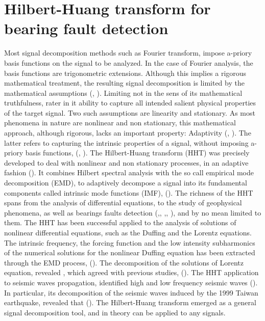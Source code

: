 \documentclass[../Main/thesis.tex]{subfiles}
\begin{document}
\chapter[Hilbert-Huang transform applied to bearing fault detection]{Hilbert-Huang transform for bearing fault detection}
\label{sec:hht}

Most signal decomposition methods such as Fourier transform, impose a-priory basis functions on the signal to be analyzed. In the case of Fourier analysis, the basis functions are trigonometric extensions. Although this implies a rigorous mathematical treatment, the resulting signal decomposition is limited by the mathematical assumptions (\cite{huang98}, \cite{huang08}). Limiting not in the sens of its mathematical truthfulness, rater in it ability to capture all intended salient physical properties of the target signal. Two such assumptions are linearity and stationary. As most phenomena in nature are nonlinear and non stationary, this mathematical approach, although rigorous, lacks an important property: Adaptivity (\cite{huang98}, \cite{huang08}). The latter refers to capturing the intrinsic properties of a signal, without imposing a-priory basis functions, (\cite{huang98}, \cite{huang08}). 
\justify 
The Hilbert-Huang transform (HHT) was precisely developed to deal with nonlinear and non stationary processes, in an adaptive fashion (\cite{huang98}). It combines Hilbert spectral analysis with the so call empirical mode decomposition (EMD), to adaptively decompose a signal into its fundamental components called intrinsic mode functions (IMF), (\cite{huang98}).
The richness of the HHT spans from the analysis of differential equations, to the study of geophysical phenomena, as well as bearings faults detection (\cite{huang08},\cite{li2009}, \cite{yan2006} ,\cite{soualhi2015}, \cite{sallo2019}), and by no mean limited to them.
\justify
 The HHT has been successful applied to the analysis of solutions of nonlinear differential equations, such as the Duffing and the Lorentz equations. The intrinsic frequency, the forcing function and the low intensity subharmonics of the numerical solutions for the nonlinear Duffing equation has been extracted through the EMD process, (\cite{huang98}).
 \justify
  The decomposition of the solutions of Lorentz equation, revealed , which agreed with previous studies, (\cite{huang98}). The HHT application to seismic waves propagation, identified high and low frequency seismic waves (\cite{vasudevan2000}). In particular, its decomposition of the seismic waves induced by the 1999 Taiwan earthquake, revealed that  (\cite{huang2001}). The Hilbert-Huang transform emerged as a general signal decomposition tool, and in theory can be applied to any signals.
\end{document}
